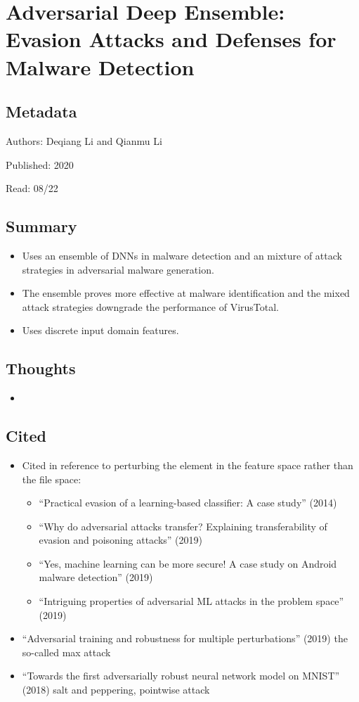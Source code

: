 \documentclass{article}
\begin{document}
\section*{Adversarial Deep Ensemble: Evasion Attacks and Defenses for Malware Detection}

\subsection*{Metadata}

\noindent Authors: Deqiang Li and Qianmu Li

\noindent Published: 2020

\noindent Read: 08/22

\subsection*{Summary}
\begin{itemize}
\item Uses an ensemble of DNNs in malware detection and an mixture of attack strategies in adversarial malware generation.
\item The ensemble proves more effective at malware identification and the mixed attack strategies downgrade the performance of VirusTotal.
\item Uses discrete input domain features.
\end{itemize}

\subsection*{Thoughts}
\begin{itemize}
\item
\end{itemize}

\subsection*{Cited}
\begin{itemize}
\item Cited in reference to perturbing the element in the feature space rather than the file space:
	\begin{itemize}
	\item ``Practical evasion of a learning-based classifier: A case study'' (2014)
	\item ``Why do adversarial attacks transfer? Explaining transferability of evasion and poisoning attacks'' (2019)
	\item ``Yes, machine learning can be more secure! A case study on Android malware detection'' (2019)
	\item ``Intriguing properties of adversarial ML attacks in the problem space'' (2019)
	\end{itemize}
\item ``Adversarial training and robustness for multiple perturbations'' (2019) the so-called max attack
\item ``Towards the first adversarially robust neural network model on MNIST'' (2018) salt and peppering, pointwise attack
\end{itemize}
\end{document}
